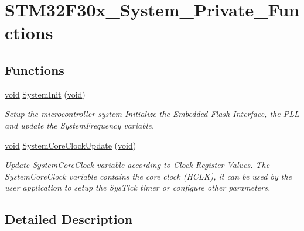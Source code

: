\hypertarget{group___s_t_m32_f30x___system___private___functions}{\section{S\-T\-M32\-F30x\-\_\-\-System\-\_\-\-Private\-\_\-\-Functions}
\label{group___s_t_m32_f30x___system___private___functions}
}
\subsection*{Functions}
\begin{DoxyCompactItemize}
\item 
\hyperlink{group___n_a_m_e_ga18028b8badbf1ea7e704ccac3c488e82}{void} \hyperlink{group___s_t_m32_f30x___system___private___functions_ga93f514700ccf00d08dbdcff7f1224eb2}{System\-Init} (\hyperlink{group___n_a_m_e_ga18028b8badbf1ea7e704ccac3c488e82}{void})
\begin{DoxyCompactList}\small\item\em Setup the microcontroller system Initialize the Embedded Flash Interface, the P\-L\-L and update the System\-Frequency variable. \end{DoxyCompactList}\item 
\hyperlink{group___n_a_m_e_ga18028b8badbf1ea7e704ccac3c488e82}{void} \hyperlink{group___s_t_m32_f30x___system___private___functions_gae0c36a9591fe6e9c45ecb21a794f0f0f}{System\-Core\-Clock\-Update} (\hyperlink{group___n_a_m_e_ga18028b8badbf1ea7e704ccac3c488e82}{void})
\begin{DoxyCompactList}\small\item\em Update System\-Core\-Clock variable according to Clock Register Values. The System\-Core\-Clock variable contains the core clock (H\-C\-L\-K), it can be used by the user application to setup the Sys\-Tick timer or configure other parameters. \end{DoxyCompactList}\end{DoxyCompactItemize}


\subsection{Detailed Description}


